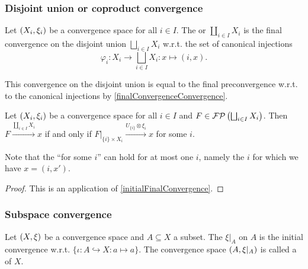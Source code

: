 \subsubsection{Disjoint union or coproduct convergence}
\begin{definition}
Let $\left( X_i, \xi_i \right)$ be a convergence space for all $i\in I$. The  or  $\coprod_{i\in I}X_i$ is the final convergence on the disjoint union $\bigsqcup_{i\in I}X_i$ w.r.t. the set of canonical injections
\[ \varphi_i: X_i \to \bigsqcup_{i\in I}X_i: x\mapsto (i, x). \]
\end{definition}
This convergence on the disjoint union is equal to the final preconvergence w.r.t. to the canonical injections by \ref{finalConvergenceConvergence}.

\begin{proposition}
Let $\left( X_i, \xi_i \right)$ be a convergence space for all $i\in I$ and $F\in\operatorname{\mathcal{FP}}\left(\bigsqcup_{i\in I}X_i\right)$. Then $F\overset{\coprod_{i\in I}X_i}{\longrightarrow} x$ \textup{if and only if} $F|_{\{i\}\times X_i} \overset{U_{\{i\}}\otimes \xi_i}{\longrightarrow} x$ for some $i$.
\end{proposition}
Note that the ``for some $i$'' can hold for at most one $i$, namely the $i$ for which we have $x = (i, x')$.
\begin{proof}
This is an application of \ref{initialFinalConvergence}.
\end{proof}


\subsubsection{Subspace convergence}
\begin{definition}
Let $\left( X,\xi \right)$ be a convergence space and $A\subseteq X$ a subset. The  $\xi|_A$ on $A$ is the initial convergence w.r.t. $\{\iota: A \hookrightarrow X: a\mapsto a\}$. The convergence space $\left( A,\xi|_A \right)$ is called a  of $X$.
\end{definition}

